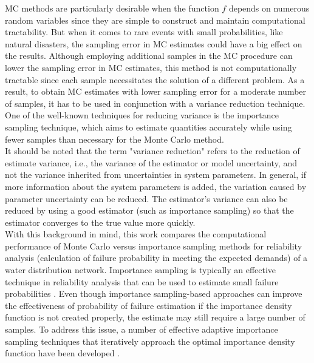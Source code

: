     MC methods are particularly desirable when the function $f$ depends on numerous random variables since they are simple to construct and maintain computational tractability. But when it comes to rare events with small probabilities, like natural disasters, the sampling error in MC estimates could have a big effect on the results. Although employing additional samples in the MC procedure can lower the sampling error in MC estimates, this method is not computationally tractable since each sample necessitates the solution of a different problem. As a result, to obtain MC estimates with lower sampling error for a moderate number of samples, it has to be used in conjunction with a variance reduction technique. One of the well-known techniques for reducing variance is the importance sampling technique, which aims to estimate quantities accurately while using fewer samples than necessary for the Monte Carlo method. \\
    It should be noted that the term "variance reduction" refers to the reduction of estimate variance, i.e., the variance of the estimator or model uncertainty, and not the variance inherited from uncertainties in system parameters. In general, if more information about the system parameters is added, the variation caused by parameter uncertainty can be reduced. The estimator's variance can also be reduced by using a good estimator (such as importance sampling) so that the estimator converges to the true value more quickly.\\
    With this background in mind, this work compares the computational performance of Monte Carlo versus importance sampling methods for reliability analysis (calculation of failure probability in meeting the expected demands) of a water distribution network. Importance sampling is typically an effective technique in reliability analysis that can be used to estimate small failure probabilities \cite{melchers_importance_1989, heinkenschloss_conditional-value-at-risk_2018}. Even though importance sampling-based approaches can improve the effectiveness of probability of failure estimation if the importance density function is not created properly, the estimate may still require a large number of samples. To address this issue, a number of effective adaptive importance sampling techniques that iteratively approach the optimal importance density function have been developed \cite{tomasson_improved_2017, depina_coupling_2017, ching_efficient_2009, chaudhuri_information_2020, aslam_ansari_data-driven_2020}. \\

